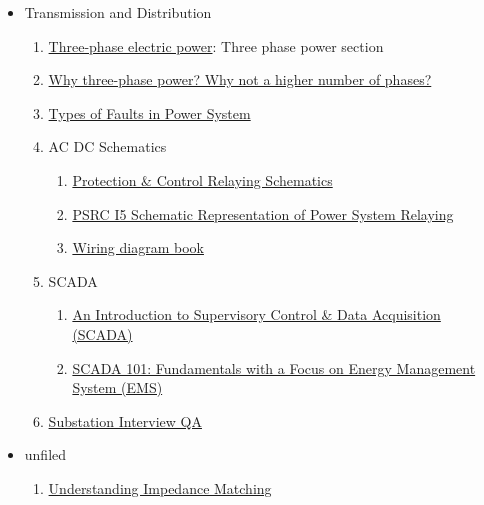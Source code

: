 \documentclass{article}
\begin{document}
\begin{itemize}
    \item Transmission and Distribution
    \begin{enumerate}
        \item \href{https://en.wikipedia.org/wiki/Three-phase_electric_power}{Three-phase electric power}: Three phase power section
        \item \href{https://electronics.stackexchange.com/questions/185308/why-three-phase-power-why-not-a-higher-number-of-phases}{Why three-phase power? Why not a higher number of phases?}
        \item \href{https://circuitglobe.com/types-of-faults-in-power-system.html}{Types of Faults in Power System}
        \item AC DC Schematics
        \begin{enumerate}
            \item \href{https://electrical-engineering-portal.com/ac-dc-schematics-protection-control-relaying}{Protection \& Control Relaying Schematics}
            \item \href{https://www.pes-psrc.org/kb/report/047.pdf}{PSRC I5 Schematic Representation of Power System Relaying}
            \item \href{https://www.daltco.com/sites/daltco.com/files/resource/schneider-wiring-diagram-book.pdf}{Wiring diagram book}
        \end{enumerate}
        \item SCADA 
        \begin{enumerate}
            \item \href{https://www.solisplc.com/scada}{An Introduction to Supervisory Control \& Data Acquisition (SCADA)}
            \item \href{https://www.euci.com/event_post/scada-fundamentals-energy-management-system/}{SCADA 101: Fundamentals with a Focus on Energy Management System (EMS)}
        \end{enumerate}
        \item \href{https://www.eeeguide.com/substations-interview-questions-and-answers/}{Substation Interview QA}
    \end{enumerate}

    \item unfiled
    \begin{enumerate}
        \item \href{https://eepower.com/technical-articles/understanding-impedance-matching/#}{Understanding Impedance Matching}
    \end{enumerate}
\end{itemize}
\end{document}

